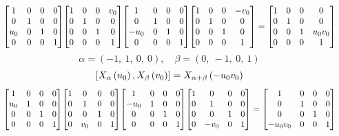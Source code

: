 \documentclass[11pt]{article}
\theoremstyle{definition}
\begin{document}
\[
\scaletoalign{\textwidth}{{\left[\begin{matrix}1 & 0 & 0 & 0\\0 & 1 & 0 & 0\\u_{0} & 0 & 1 & 0\\0 & 0 & 0 & 1\end{matrix}\right]} {\left[\begin{matrix}1 & 0 & 0 & v_{0}\\0 & 1 & 0 & 0\\0 & 0 & 1 & 0\\0 & 0 & 0 & 1\end{matrix}\right]} {\left[\begin{matrix}1 & 0 & 0 & 0\\0 & 1 & 0 & 0\\- u_{0} & 0 & 1 & 0\\0 & 0 & 0 & 1\end{matrix}\right]} {\left[\begin{matrix}1 & 0 & 0 & - v_{0}\\0 & 1 & 0 & 0\\0 & 0 & 1 & 0\\0 & 0 & 0 & 1\end{matrix}\right]} = {\left[\begin{matrix}1 & 0 & 0 & 0\\0 & 1 & 0 & 0\\0 & 0 & 1 & u_{0} v_{0}\\0 & 0 & 0 & 1\end{matrix}\right]}}
\]
\[
\alpha = \left( -1, \  1, \  0, \  0\right), \quad \beta = \left( 0, \  -1, \  0, \  1\right)
\]
\[
\scaletoalign{\textwidth}{\left[ X_{\alpha}\left(u_{0}\right), X_{\beta}\left(v_{0}\right) \right] = X_{\alpha + \beta}\left(- u_{0} v_{0}\right)}
\]
\[
\scaletoalign{\textwidth}{{\left[\begin{matrix}1 & 0 & 0 & 0\\u_{0} & 1 & 0 & 0\\0 & 0 & 1 & 0\\0 & 0 & 0 & 1\end{matrix}\right]} {\left[\begin{matrix}1 & 0 & 0 & 0\\0 & 1 & 0 & 0\\0 & 0 & 1 & 0\\0 & v_{0} & 0 & 1\end{matrix}\right]} {\left[\begin{matrix}1 & 0 & 0 & 0\\- u_{0} & 1 & 0 & 0\\0 & 0 & 1 & 0\\0 & 0 & 0 & 1\end{matrix}\right]} {\left[\begin{matrix}1 & 0 & 0 & 0\\0 & 1 & 0 & 0\\0 & 0 & 1 & 0\\0 & - v_{0} & 0 & 1\end{matrix}\right]} = {\left[\begin{matrix}1 & 0 & 0 & 0\\0 & 1 & 0 & 0\\0 & 0 & 1 & 0\\- u_{0} v_{0} & 0 & 0 & 1\end{matrix}\right]}}
\]
\end{document}
